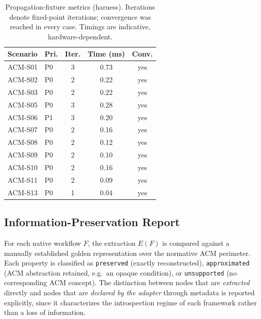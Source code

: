 \documentclass[10pt]{article}
\begin{document}
\begin{table}[htbp]
	\centering
	\caption{Propagation-fixture metrics (harness). Iterations denote
		fixed-point iterations; convergence was reached in every case. Timings are indicative, hardware-dependent.}
	\label{tab:app-eval-fixtures}
	\small
	\begin{tabular}{@{}llccc@{}}
		\toprule
		\textbf{Scenario} & \textbf{Pri.} & \textbf{Iter.} & \textbf{Time (ms)} & \textbf{Conv.} \\
		\midrule
		ACM-S01 & P0 & 3 & 0.73 & yes \\
		ACM-S02 & P0 & 2 & 0.22 & yes \\
		ACM-S03 & P0 & 2 & 0.22 & yes \\
		ACM-S05 & P0 & 3 & 0.28 & yes \\
		ACM-S06 & P1 & 3 & 0.20 & yes \\
		ACM-S07 & P0 & 2 & 0.16 & yes \\
		ACM-S08 & P0 & 2 & 0.12 & yes \\
		ACM-S09 & P0 & 2 & 0.10 & yes \\
		ACM-S10 & P0 & 2 & 0.16 & yes \\
		ACM-S11 & P0 & 2 & 0.09 & yes \\
		ACM-S13 & P0 & 1 & 0.04 & yes \\
		\bottomrule
	\end{tabular}
\end{table}

\subsection{Information-Preservation Report}
\label{app:report-preservation}

For each native workflow $F$, the extraction $E(F)$ is compared against a
manually established golden representation over the normative ACM
perimeter. Each property is classified as \texttt{preserved} (exactly
reconstructed), \texttt{approximated} (ACM abstraction retained, e.g.\ an
opaque condition), or \texttt{unsupported} (no corresponding ACM concept).
The distinction between nodes that are \emph{extracted} directly and
nodes that are \emph{declared by the adapter} through metadata is
reported explicitly, since it characterizes the introspection regime of
each framework rather than a loss of information.
\end{document}
